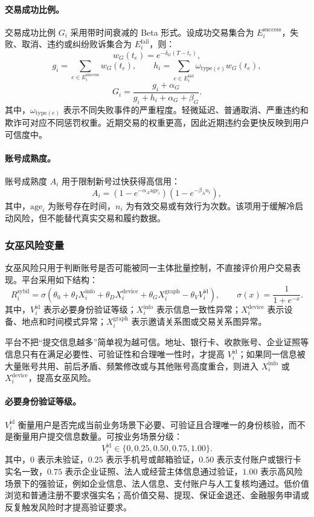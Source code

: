 \documentclass[UTF8,a4paper,12pt]{ctexart}
\begin{document}
\paragraph{交易成功比例。}
交易成功比例 $G_i$ 采用带时间衰减的 Beta 形式。设成功交易集合为 $E_i^{\mathrm{success}}$，失败、取消、违约或纠纷败诉集合为 $E_i^{\mathrm{fail}}$，则：
\[
    w_G(t_e)=e^{-\delta_G(T-t_e)},
\]
\[
    g_i
    =
    \sum_{e\in E_i^{\mathrm{success}}}
    w_G(t_e),
    \qquad
    h_i
    =
    \sum_{e\in E_i^{\mathrm{fail}}}
    \omega_{\mathrm{type}(e)}w_G(t_e),
\]
\[
    G_i
    =
    \frac{
        g_i+\alpha_G
    }{
        g_i+h_i+\alpha_G+\beta_G
    }.
\]
其中，$\omega_{\mathrm{type}(e)}$ 表示不同失败事件的严重程度。轻微延迟、普通取消、严重违约和欺诈可对应不同惩罚权重。近期交易的权重更高，因此近期违约会更快反映到用户可信度中。

\paragraph{账号成熟度。}
账号成熟度 $A_i$ 用于限制新号过快获得高信用：
\[
    A_i
    =
    \left(1-e^{-\alpha_A\mathrm{age}_i}\right)
    \left(1-e^{-\beta_A n_i}\right),
\]
其中，$\mathrm{age}_i$ 为账号存在时间，$n_i$ 为有效交易或有效行为次数。该项用于缓解冷启动风险，但不能替代真实交易和履约数据。

\subsubsection{女巫风险变量}

女巫风险只用于判断账号是否可能被同一主体批量控制，不直接评价用户交易表现。平台采用如下结构：
\[
    R_i^{\mathrm{sybil}}
    =
    \sigma\left(
    \theta_0
    +\theta_I X_i^{\mathrm{info}}
    +\theta_D X_i^{\mathrm{device}}
    +\theta_G X_i^{\mathrm{graph}}
    -\theta_V V_i^{\mathrm{id}}
    \right),
    \qquad
    \sigma(x)=\frac{1}{1+e^{-x}}.
\]
其中，$V_i^{\mathrm{id}}$ 表示必要身份验证等级；$X_i^{\mathrm{info}}$ 表示信息一致性异常；$X_i^{\mathrm{device}}$ 表示设备、地点和时间模式异常；$X_i^{\mathrm{graph}}$ 表示邀请关系图或交易关系图异常。

平台不把“提交信息越多”简单视为越可信。地址、银行卡、收款账号、企业证照等信息只有在满足必要性、可验证性和合理唯一性时，才提高 $V_i^{\mathrm{id}}$；如果同一信息被大量账号共用、前后矛盾、频繁修改或与其他账号高度重合，则进入 $X_i^{\mathrm{info}}$ 或 $X_i^{\mathrm{device}}$，提高女巫风险。

\paragraph{必要身份验证等级。}
$V_i^{\mathrm{id}}$ 衡量用户是否完成当前业务场景下必要、可验证且合理唯一的身份核验，而不是衡量用户提交信息数量。可按业务场景分级：
\[
    V_i^{\mathrm{id}}\in\{0,0.25,0.50,0.75,1.00\}.
\]
其中，$0$ 表示未验证，$0.25$ 表示手机号或邮箱验证，$0.50$ 表示支付账户或银行卡实名一致，$0.75$ 表示企业证照、法人或经营主体信息通过验证，$1.00$ 表示高风险场景下的强验证，例如企业信息、法人信息、支付账户与人工复核均通过。低价值浏览和普通注册不要求强实名；高价值交易、提现、保证金退还、金融服务申请或反复触发风险时才提高验证要求。
\end{document}
